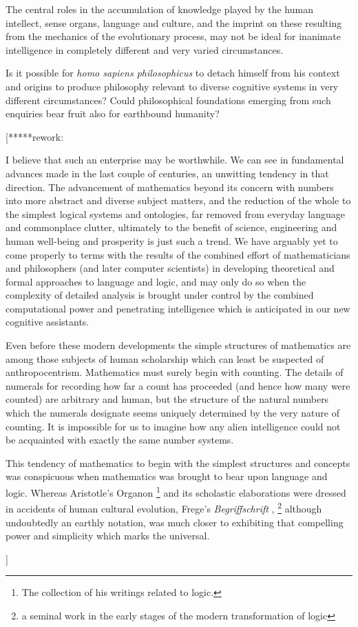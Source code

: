 \documentclass[10pt,titlepage]{book}
\begin{document}
The central roles in the accumulation of knowledge played by the human intellect, sense organs, language and culture, and the imprint on these resulting from the mechanics of the evolutionary process, may not be ideal for inanimate intelligence in completely different and very varied circumstances.

Is it possible for \emph{homo sapiens philosophicus} to detach himself from his context and origins to produce philosophy relevant to diverse cognitive systems in very different circumstances?
Could philosophical foundations emerging from such enquiries bear fruit also for earthbound humanity?

[*****rework:{\it

I believe that such an enterprise may be worthwhile.
We can see in fundamental advances made in the last couple of centuries, an unwitting tendency in that direction.
The advancement of mathematics beyond its concern with numbers into more abstract and diverse subject matters, and the reduction of the whole to the simplest logical systems and ontologies, far removed from everyday language and commonplace clutter, ultimately to the benefit of science, engineering and human well-being and prosperity is just such a trend.
We have arguably yet to come properly to terms with the results of the combined effort of mathematicians and philosophers (and later computer scientists) in developing theoretical and formal approaches to language and logic, and may only do so when the complexity of detailed analysis is brought under control by the combined computational power and penetrating intelligence which is anticipated in our new cognitive assistants.

Even before these modern developments the simple structures of mathematics are among those subjects of human scholarship which can least be suspected of anthropocentrism.
Mathematics must surely begin with counting.
The details of numerals for recording how far a count has proceeded (and hence how many were counted) are arbitrary and human, but the structure of the natural numbers which the numerals designate seems uniquely determined by the very nature of counting.
It is impossible for us to imagine how any alien intelligence could not be acquainted with exactly the same number systems.

This tendency of mathematics to begin with the simplest structures and concepts was conspicuous when mathematics was brought to bear upon language and logic.
Whereas Aristotle's Organon%
\footnote{The collection of his writings related to logic.}%
and its scholastic elaborations were dressed in accidents of human cultural evolution, Frege's \emph{Begriffschrift} \cite{frege79}, %
\footnote{a seminal work in the early stages of the modern transformation of logic}%
  although undoubtedly an earthly notation, was much closer to exhibiting that compelling power and simplicity which marks the universal.

}]
\end{document}
